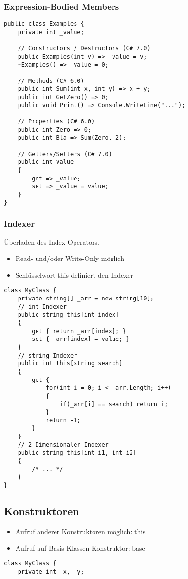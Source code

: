 \begin{multicols*}{2}
\subsubsection{Expression-Bodied Members}
\begin{lstlisting}
public class Examples { 
    private int _value;
    
    // Constructors / Destructors (C# 7.0)
    public Examples(int v) => _value = v;
    ~Examples() => _value = 0;
    
    // Methods (C# 6.0)
    public int Sum(int x, int y) => x + y; 
    public int GetZero() => 0;
    public void Print() => Console.WriteLine("...");
    
    // Properties (C# 6.0)
    public int Zero => 0;
    public int Bla => Sum(Zero, 2);
    
    // Getters/Setters (C# 7.0)
    public int Value 
    { 
        get => _value;
        set => _value = value;
    }
}
\end{lstlisting}

\subsubsection{Indexer}
Überladen des Index-Operators.
\begin{itemize}
    \item Read- und/oder Write-Only möglich
    \item Schlüsselwort this definiert den Indexer
\end{itemize}
\begin{lstlisting}
class MyClass {
    private string[] _arr = new string[10];
    // int-Indexer
    public string this[int index]
    {
        get { return _arr[index]; }
        set { _arr[index] = value; }
    }
    // string-Indexer
    public int this[string search]
    {   
        get {
            for(int i = 0; i < _arr.Length; i++) 
            { 
                if(_arr[i] == search) return i; 
            } 
            return -1;
        } 
    }
    // 2-Dimensionaler Indexer
    public string this[int i1, int i2]
    { 
        /* ... */ 
    } 
}
\end{lstlisting}

\subsection{Konstruktoren}
\begin{itemize}
    \item Aufruf anderer Konstruktoren möglich: this
    \item Aufruf auf Basis-Klassen-Konstruktor: base
\end{itemize}
\begin{lstlisting}
class MyClass {
    private int _x, _y;
    

\end{lstlisting}
\end{multicols*}
